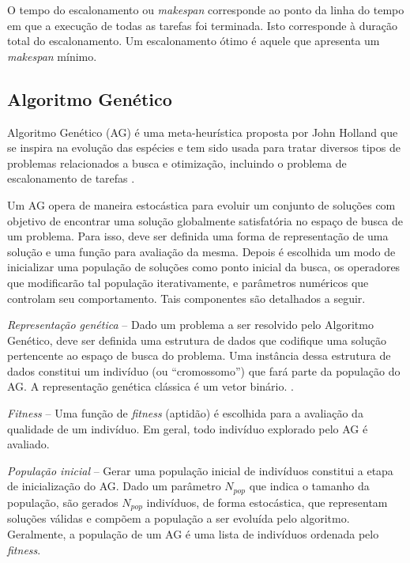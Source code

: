\documentclass[fleqn,10pt]{SelfArx} %
\begin{document}
O tempo do escalonamento ou \textit{makespan} corresponde ao ponto da linha do tempo em que a execução de todas as tarefas foi terminada. Isto corresponde à duração total do escalonamento. Um escalonamento ótimo é aquele que apresenta um \textit{makespan} mínimo.


\subsection{Algoritmo Genético}
Algoritmo Genético (AG) é uma meta-heurística proposta por John Holland que se inspira na evolução das espécies e tem sido usada para tratar diversos tipos de problemas relacionados a busca e otimização, incluindo o problema de escalonamento de tarefas \cite{Goldberg:1989:GAS:534133}.

Um AG opera de maneira estocástica para evoluir um conjunto de soluções com objetivo de encontrar uma solução globalmente satisfatória no espaço de busca de um problema. Para isso, deve ser definida uma forma de representação de uma solução e uma função para avaliação da mesma. Depois é escolhida um modo de inicializar uma população de soluções como ponto inicial da busca, os operadores que modificarão tal população iterativamente, e parâmetros numéricos que controlam seu comportamento. Tais componentes são detalhados a seguir.


\textit{Representação genética} -- Dado um problema a ser resolvido pelo Algoritmo Genético, deve ser definida uma estrutura de dados que codifique uma solução pertencente ao espaço de busca do problema. Uma instância dessa estrutura de dados constitui um indivíduo (ou ``cromossomo'') que fará parte da população do AG. A representação genética clássica é um vetor binário. \cite{Goldberg:1989:GAS:534133}.

\textit{Fitness} -- Uma função de \textit{fitness} (aptidão) é escolhida para a avaliação da qualidade de um indivíduo. Em geral, todo indivíduo explorado pelo AG é avaliado.

\textit{População inicial} -- Gerar uma população inicial de indivíduos constitui a etapa de inicialização do AG. Dado um parâmetro \(N_{pop}\) que indica o tamanho da população, são gerados \(N_{pop}\) indivíduos, de forma estocástica, que representam soluções válidas e compõem a população a ser evoluída pelo algoritmo. Geralmente, a população de um AG é uma lista de indivíduos ordenada pelo \textit{fitness}. 
\end{document}
